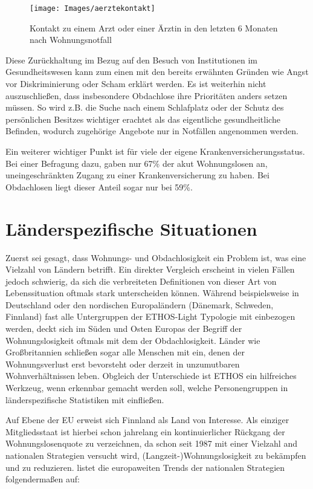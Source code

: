 \begin{figure}[h]
	\centering
	\texttt{[image: Images/aerztekontakt]}
	\caption[Ärztekontakt nach Wohnungsnotfall]{Kontakt zu einem Arzt oder einer Ärztin in den letzten 6 Monaten nach Wohnungsnotfall \citep{BAGW.2022}}
	\label{fig:aerztekontakt}
\end{figure}

Diese Zurückhaltung im Bezug auf den Besuch von Institutionen im Gesundheitswesen kann zum einen mit den bereits erwähnten Gründen wie Angst vor Diskriminierung oder Scham \citep{Kaduszkiewicz.2017} erklärt werden. Es ist weiterhin nicht auszuschließen, dass insbesondere Obdachlose ihre Prioritäten anders setzen müssen. So wird z.B. die Suche nach einem Schlafplatz oder der Schutz des persönlichen Besitzes wichtiger erachtet als das eigentliche gesundheitliche Befinden, wodurch zugehörige Angebote nur in Notfällen angenommen werden.

Ein weiterer wichtiger Punkt ist für viele der eigene Krankenversicherungsstatus. Bei einer Befragung dazu, gaben nur 67\% der akut Wohnungslosen an, uneingeschränkten Zugang zu einer Krankenversicherung zu haben. Bei Obdachlosen liegt dieser Anteil sogar nur bei 59\%.

\section{Länderspezifische Situationen}

Zuerst sei gesagt, dass Wohnungs- und Obdachlosigkeit ein Problem ist, was eine Vielzahl von Ländern betrifft. Ein direkter Vergleich erscheint in vielen Fällen jedoch schwierig, da sich die verbreiteten Definitionen von dieser Art von Lebenssituation oftmals stark unterscheiden können. Während beispielsweise in Deutschland oder den nordischen Europaländern (Dänemark, Schweden, Finnland) fast alle Untergruppen der ETHOS-Light Typologie mit einbezogen werden, deckt sich im Süden und Osten Europas der Begriff der Wohnungslosigkeit oftmals mit dem der Obdachlosigkeit. Länder wie Großbritannien schließen sogar alle Menschen mit ein, denen der Wohnungsverlust erst bevorsteht oder derzeit in unzumutbaren Wohnverhältnissen leben. Obgleich der Unterschiede ist ETHOS ein hilfreiches Werkzeug, wenn erkennbar gemacht werden soll, welche Personengruppen in länderspezifische Statistiken mit einfließen. \citep{Busch-Geertsema.2018}

Auf Ebene der EU erweist sich Finnland als Land von Interesse. Als einziger Mitgliedsstaat ist hierbei schon jahrelang ein kontinuierlicher Rückgang der Wohnungslosenquote zu verzeichnen, da schon seit 1987 mit einer Vielzahl and nationalen Strategien versucht wird, (Langzeit-)Wohnungslosigkeit zu bekämpfen und zu reduzieren. \citet{Busch-Geertsema.2012} listet die europaweiten Trends der nationalen Strategien folgendermaßen auf:

